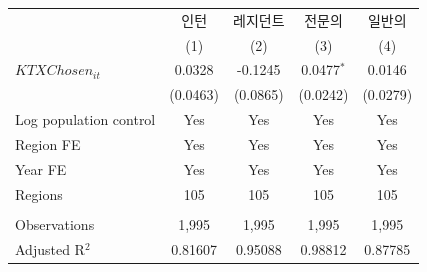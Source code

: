 \begingroup
\centering
\begin{tabular}{lcccc}
   \toprule
                          & 인턴     & 레지던트 & 전문의       & 일반의 \\   
                          & (1)      & (2)      & (3)          & (4)\\  
   \midrule 
   $KTXChosen_{it}$       & 0.0328   & -0.1245  & 0.0477$^{*}$ & 0.0146\\   
                          & (0.0463) & (0.0865) & (0.0242)     & (0.0279)\\   
   Log population control & Yes      & Yes      & Yes          & Yes\\  
   Region FE              & Yes      & Yes      & Yes          & Yes\\  
   Year FE                & Yes      & Yes      & Yes          & Yes\\  
   Regions                & 105      & 105      & 105          & 105\\  
    \\
   Observations           & 1,995    & 1,995    & 1,995        & 1,995\\  
   Adjusted R$^2$         & 0.81607  & 0.95088  & 0.98812      & 0.87785\\  
   \bottomrule
\end{tabular}
\par\endgroup
